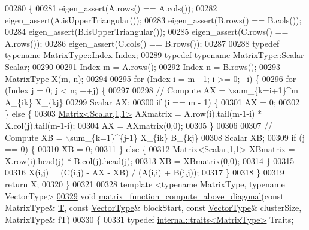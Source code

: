 \begin{DoxyCode}
00280 \{
00281   eigen\_assert(A.rows() == A.cols());
00282   eigen\_assert(A.isUpperTriangular());
00283   eigen\_assert(B.rows() == B.cols());
00284   eigen\_assert(B.isUpperTriangular());
00285   eigen\_assert(C.rows() == A.rows());
00286   eigen\_assert(C.cols() == B.rows());
00287 
00288   \textcolor{keyword}{typedef} \textcolor{keyword}{typename} MatrixType::Index \hyperlink{namespace_eigen_a62e77e0933482dafde8fe197d9a2cfde}{Index};
00289   \textcolor{keyword}{typedef} \textcolor{keyword}{typename} MatrixType::Scalar Scalar;
00290 
00291   Index m = A.rows();
00292   Index n = B.rows();
00293   MatrixType X(m, n);
00294 
00295   \textcolor{keywordflow}{for} (Index i = m - 1; i >= 0; --i) \{
00296     \textcolor{keywordflow}{for} (Index j = 0; j < n; ++j) \{
00297 
00298       \textcolor{comment}{// Compute AX = \(\backslash\)sum\_\{k=i+1\}^m A\_\{ik\} X\_\{kj\}}
00299       Scalar AX;
00300       \textcolor{keywordflow}{if} (i == m - 1) \{
00301     AX = 0; 
00302       \} \textcolor{keywordflow}{else} \{
00303     \hyperlink{group___core___module_class_eigen_1_1_matrix}{Matrix<Scalar,1,1>} AXmatrix = A.row(i).tail(m-1-i) * X.col(j).tail(m-1-i);
00304     AX = AXmatrix(0,0);
00305       \}
00306 
00307       \textcolor{comment}{// Compute XB = \(\backslash\)sum\_\{k=1\}^\{j-1\} X\_\{ik\} B\_\{kj\}}
00308       Scalar XB;
00309       \textcolor{keywordflow}{if} (j == 0) \{
00310     XB = 0; 
00311       \} \textcolor{keywordflow}{else} \{
00312     \hyperlink{group___core___module_class_eigen_1_1_matrix}{Matrix<Scalar,1,1>} XBmatrix = X.row(i).head(j) * B.col(j).head(j);
00313     XB = XBmatrix(0,0);
00314       \}
00315 
00316       X(i,j) = (C(i,j) - AX - XB) / (A(i,i) + B(j,j));
00317     \}
00318   \}
00319   \textcolor{keywordflow}{return} X;
00320 \}
00321 
00328 \textcolor{keyword}{template} <\textcolor{keyword}{typename} MatrixType, \textcolor{keyword}{typename} VectorType>
\hyperlink{namespace_eigen_1_1internal_a8ff76c47bde59d8af688e5925bed8f17}{00329} \textcolor{keywordtype}{void} \hyperlink{namespace_eigen_1_1internal_a8ff76c47bde59d8af688e5925bed8f17}{matrix\_function\_compute\_above\_diagonal}(\textcolor{keyword}{const} MatrixType& 
      \hyperlink{group___sparse_core___module}{T}, \textcolor{keyword}{const} \hyperlink{struct_vector_type}{VectorType}& blockStart, \textcolor{keyword}{const} \hyperlink{struct_vector_type}{VectorType}& clusterSize, MatrixType& fT)
00330 \{ 
00331   \textcolor{keyword}{typedef} \hyperlink{struct_eigen_1_1internal_1_1traits}{internal::traits<MatrixType>} Traits;

\end{DoxyCode}
